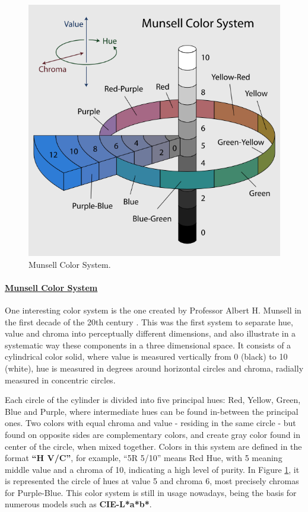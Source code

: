 \documentclass{report}
\begin{document}
\begin{figure}
  \centering
  \vspace{-\baselineskip}
  \includegraphics[width=0.9\linewidth]{MunsellSystem.png}
  \caption[Munsell Color System Representation]{Munsell Color System.\protect\footnotemark{}}
  \label{fig:munsell}
\end{figure}
%
\paragraph{\underline{Munsell Color System}} One interesting color system is the one created by
Professor Albert H. Munsell in the first decade of the 20th century \cite{Munsell1919}. This was the first system to separate
hue, value and chroma into perceptually different dimensions, and also illustrate in a systematic way these
components in a three dimensional space. It consists of a cylindrical color solid, where value is measured
vertically from 0 (black) to 10 (white), hue is measured in degrees around horizontal circles and chroma,
radially measured in concentric circles. \par
Each circle of the cylinder is divided into five principal hues: Red, Yellow, Green, Blue and Purple, where
intermediate hues can be found
in-between the principal ones. Two colors with equal chroma and value - residing in the same circle - but
found on opposite sides are complementary colors, and create gray color found in center of the
circle, when mixed together.  Colors in this system are defined in the format \textbf{“H V/C”}, for example,
“5R 5/10” means Red Hue, with 5 meaning middle value and a chroma of 10, indicating a high level of purity. In Figure \ref{fig:munsell}, it is represented the circle of hues at value 5 and chroma 6, most precisely chromas for Purple-Blue.
This color system is still in usage nowadays, being the basis for numerous models such as \textbf{CIE-L*a*b*}. \par
%
\end{document}
